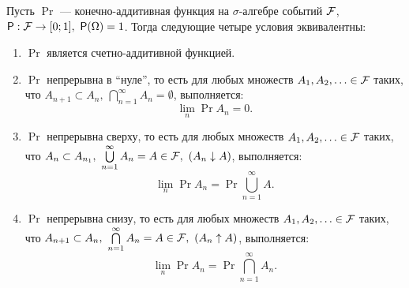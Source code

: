 \begin{theorem}
    Пусть $ \Pr $ --- конечно-аддитивная функция на $ \sigma $-алгебре событий $ \mathcal{F} $, \(\Pr: \F \to [0; 1],\ \Pr(\Omega) = 1 \). Тогда следующие четыре условия эквивалентны:
        \begin{enumerate}[label = (\alph*)]
            \item $ \Pr $ является счетно-аддитивной функцией.

            \item $ \Pr $ непрерывна в ``нуле'', то есть для любых множеств \(A_1, A_2, \ldots \in \mathcal{F} \) таких, что \(A_{n + 1} \subset A_n,\ \bigcap\limits_{n = 1}^{\infty}A_n = \emptyset \), выполняется:
            \[
                \lim\limits_{n}\Pr{A_n} = 0.
            \]

            \item $ \Pr $ непрерывна сверху, то есть для любых множеств \(A_1, A_2, \ldots \in \mathcal{F} \) таких, что \(A_{n} \subset A_{n_1},\ \bigcup\limits_{n = 1}^{\infty}A_n = A \in \mathcal{F},\  (A_n \downarrow A) \), выполняется:
            \[
            \lim\limits_{n}\Pr{A_n} = \Pr{\bigcup\limits_{n = 1}^{\infty}A}.
            \]

            \item $ \Pr $ непрерывна снизу, то есть для любых множеств \(A_1, A_2, \ldots \in \mathcal{F} \) таких, что \(A_{n + 1} \subset A_{n},\ \bigcap\limits_{n = 1}^{\infty}A_n = A \in \mathcal{F},\  (A_n \uparrow A) \), выполняется:
            \[
            \lim\limits_{n}\Pr{A_n} = \Pr{\bigcap\limits_{n = 1}^{\infty}A_n}.
            \]

        \end{enumerate}
\end{theorem}
